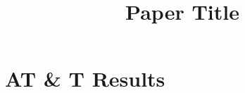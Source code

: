 \documentclass[a4paper,10pt]{article}
\title{Paper Title}
\date{}
\author{}
\begin{document}
\section{AT \& T Results}
\end{document}

